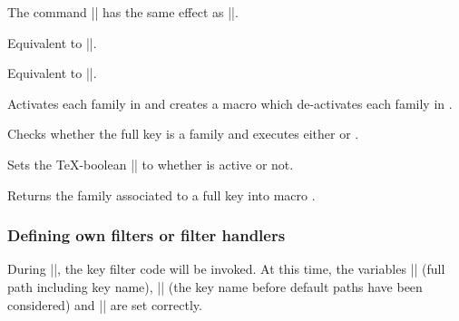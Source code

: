\begin{command}{\pgfkeysinstallkeyfilterhandler{}}%
	The command || has the same effect as ||.
\end{command}


\begin{command}{\pgfkeysactivatefamily{}}%
	Equivalent to ||.
\end{command}

\begin{command}{\pgfkeysdeactivatefamily{}}%
	Equivalent to ||.
\end{command}

\begin{command}{\pgfkeysactivatefamilies{}}%
	Activates each family in  and creates a macro  which de-activates each family in .
\begin{codeexample}
\deactivatename
\end{codeexample}
\end{command}


\begin{command}{\pgfkeysiffamilydefined{}}%
	Checks whether the full key  is a family and executes either  or .
\end{command}

\begin{command}{\pgfkeysisfamilyactive{}}%
	Sets the \TeX-boolean |\ifpgfkeysfiltercontinue| to whether  is active or not.
\end{command}

\begin{command}{\pgfkeysgetfamily{}}%
	Returns the family associated to a full key  into macro .
\end{command}

\subsubsection{Defining own filters or filter handlers}
\label{section-key-writing-filters}
	During |\pgfkeysfiltered|, the key filter code will be invoked. At this time, the variables |\pgfkeyscurrentkey| (full path including key name), |\pgfkeyscurrentkeyRAW| (the key name before default paths have been considered) and |\pgfkeyscurrentvalue| are set correctly. 

